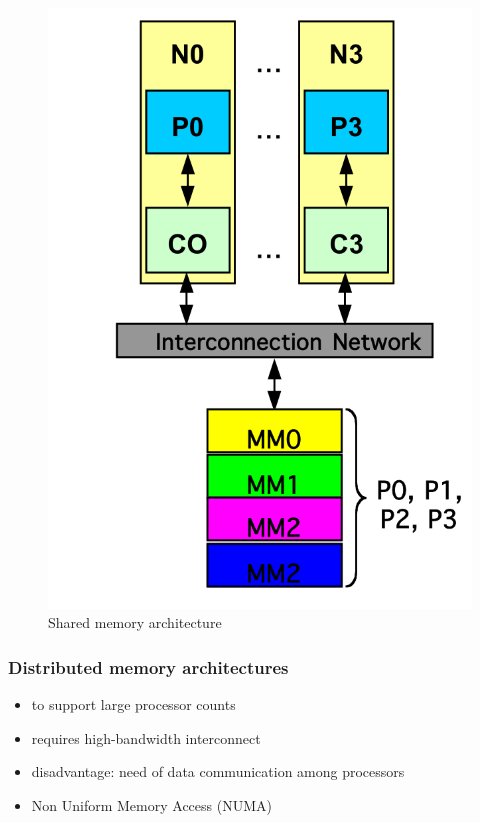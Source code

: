 \begin{figure}[h]
    \centering
    \includegraphics[scale = 0.2]{images/centralized-shared-memory-architectures}
    \caption{Shared memory architecture}
    \label{fig:centralized-shared-memory-architectures}
\end{figure}

\subsubsection{Distributed memory architectures}\label{subsubsec:distributed-memory-architectures}
\begin{itemize}
    \item to support large processor counts
    \item requires high-bandwidth interconnect
    \item disadvantage: need of data communication among processors
    \item Non Uniform Memory Access (NUMA)
\end{itemize}

